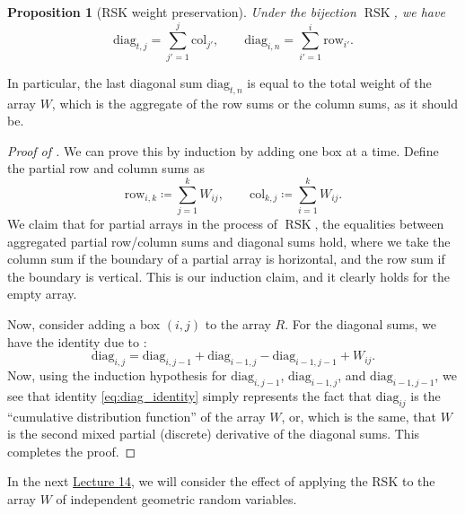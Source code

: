 \documentclass[letterpaper,11pt,oneside,reqno]{article}
\numberwithin{equation}{section}
\newtheorem{proposition}{Proposition}[section]
\theoremstyle{definition}
\begin{document}
\begin{proposition}[RSK weight preservation]
	\label{prop:RSK_weight_preservation}
	Under the bijection $\operatorname{RSK}$, we have
	\begin{equation*}
		\mathrm{diag}_{t,j}=\sum_{j'=1}^j\mathrm{col}_{j'},\qquad
		\mathrm{diag}_{i,n}=\sum_{i'=1}^i\mathrm{row}_{i'}.
	\end{equation*}
\end{proposition}
In particular, the last diagonal sum $\mathrm{diag}_{t,n}$
is equal to the total weight of the array $W$, which is the
aggregate of the row sums or the column sums, as it should
be.
\begin{proof}[Proof of ]
	We can prove this by induction by adding one box at a time.
	Define the partial row and column sums
	as
	\begin{equation*}
		\mathrm{row}_{i,k}\coloneqq \sum_{j=1}^k W_{ij}, \qquad
		\mathrm{col}_{k,j} \coloneqq \sum_{i=1}^k W_{ij}.
	\end{equation*}
	We claim that for partial arrays in the process of $\operatorname{RSK}$,
	the equalities between aggregated partial row/column sums and diagonal sums hold,
	where we take the column sum if the boundary of a partial array is horizontal,
	and the row sum if the boundary is vertical. This is our induction
	claim, and it clearly holds for the empty array.

	Now, consider adding a box $(i,j)$ to the array $R$.
	For the diagonal sums, we have the identity
	due to :
	\begin{equation}
		\label{eq:diag_identity}
		\mathrm{diag}_{i,j} = \mathrm{diag}_{i,j-1} + \mathrm{diag}_{i-1,j} - \mathrm{diag}_{i-1,j-1} + W_{ij}.
	\end{equation}
	Now, using the induction hypothesis for
	$\mathrm{diag}_{i,j-1}$, $\mathrm{diag}_{i-1,j}$,
	and $\mathrm{diag}_{i-1,j-1}$, we see that
	identity \eqref{eq:diag_identity}
	simply represents the fact that
	$\mathrm{diag}_{ij}$ is the ``cumulative distribution function'' of the
	array $W$, or, which is the same, that $W$ is the second
	mixed partial (discrete) derivative of the diagonal sums.
	This completes the proof.
\end{proof}

In the next
\href{https://lpetrov.cc/rmt25/rmt25-notes/rmt2025-l14.pdf}{Lecture
14}, we will consider the effect of applying the RSK
to the array $W$ of independent geometric random variables.
\end{document}
